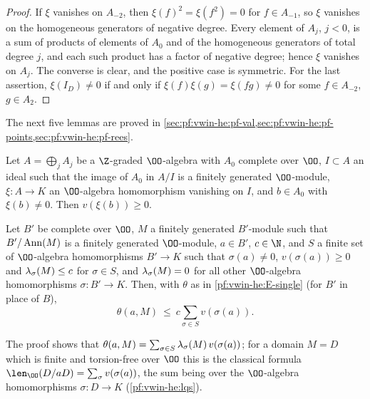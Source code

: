 \begin{proof}
If $\xi$ vanishes on $A_{-2}$, then $\xi(f)^2=\xi(f^2)=0$ for $f\in A_{-1}$, so $\xi$ vanishes on the homogeneous
generators of negative degree. Every element of $A_j$, $j<0$, is a sum of products of elements of $A_0$ and of the
homogeneous generators of total degree $j$, and each such product has a factor of negative degree; hence $\xi$
vanishes on $A_j$. The converse is clear, and the positive case is symmetric. For the last assertion, $\xi(I_D)\ne0$
if and only if $\xi(f)\xi(g)=\xi(fg)\ne0$ for some $f\in A_{-2}$, $g\in A_2$.
\end{proof}

The next five lemmas are proved in \cref{sec:pf:vwin-he:pf-val,sec:pf:vwin-he:pf-points,sec:pf:vwin-he:pf-rees}.

\begin{lemma}\label{pf:vwin-he:vnn}
Let $A=\bigoplus_jA_j$ be a $\Z$-graded $\OO$-algebra with $A_0$ complete over $\OO$, $I\subset A$ an ideal such
that the image of $A_0$ in $A/I$ is a finitely generated $\OO$-module, $\xi:A\to K$ an $\OO$-algebra homomorphism
vanishing on $I$, and $b\in A_0$ with $\xi(b)\ne0$. Then $v(\xi(b))\ge0$.
\end{lemma}

\begin{lemma}\label{pf:vwin-he:th}
Let $B'$ be complete over $\OO$, $M$ a finitely generated $B'$-module such that $B'/\operatorname{Ann}(M)$ is a finitely
generated $\OO$-module, $a\in B'$, $c\in\N$, and $S$ a finite set of $\OO$-algebra homomorphisms $B'\to K$ such
that $\sigma(a)\ne0$, $v(\sigma(a))\ge0$ and $\lambda_\sigma(M)\le c$ for $\sigma\in S$, and
$\lambda_\sigma(M)=0$ for all other $\OO$-algebra homomorphisms $\sigma:B'\to K$. Then, with $\theta$ as in
\ref{pf:vwin-he:E-single} (for $B'$ in place of $B$),
\[
 \theta(a,M)\ \le\ c\sum_{\sigma\in S}v(\sigma(a)).
\]
\end{lemma}

The proof shows that $\theta(a,M)=\sum_{\sigma\in S}\lambda_\sigma(M)\,v(\sigma(a))$; for a domain $M=D$ which
is finite and torsion-free over $\OO$ this is the classical formula $\len_\OO(D/aD)=\sum_\sigma v(\sigma(a))$, the
sum being over the $\OO$-algebra homomorphisms $\sigma:D\to K$ (\cref{pf:vwin-he:lqs}).

